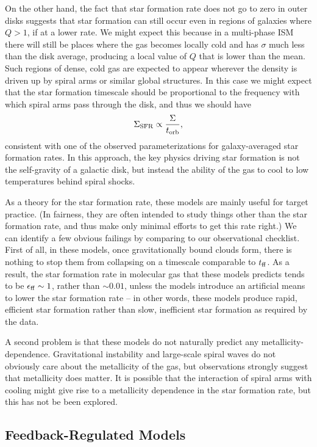 On the other hand, the fact that star formation rate does not go to zero in outer disks suggests that star formation can still occur even in regions of galaxies where $Q > 1$, if at a lower rate. We might expect this because in a multi-phase ISM there will still be places where the gas becomes locally cold and has $\sigma$ much less than the disk average, producing a local value of $Q$ that is lower than the mean. Such regions of dense, cold gas are expected to appear wherever the density is driven up by spiral arms or similar global structures. In this case we might expect that the star formation timescale should be proportional to the frequency with which spiral arms pass through the disk, and thus we should have
\begin{equation}
\Sigma_{\rm SFR} \propto \frac{\Sigma}{t_{\rm orb}},
\end{equation}
consistent with one of the observed parameterizations for galaxy-averaged star formation rates. In this approach, the key physics driving star formation is not the self-gravity of a galactic disk, but instead the ability of the gas to cool to low temperatures behind spiral shocks.

As a theory for the star formation rate, these models are mainly useful for target practice. (In fairness, they are often intended to study things other than the star formation rate, and thus make only minimal efforts to get this rate right.) We can identify a few obvious failings by comparing to our observational checklist. First of all, in these models, once gravitationally bound clouds form, there is nothing to stop them from collapsing on a timescale comparable to $t_{\rm ff}$. As a result, the star formation rate in molecular gas that these models predicts tends to be $\epsilon_{\rm ff} \sim 1$, rather than $\sim 0.01$, unless the models introduce an artificial means to lower the star formation rate -- in other words, these models produce rapid, efficient star formation rather than slow, inefficient star formation as required by the data.

A second problem is that these models do not naturally predict any metallicity-dependence. Gravitational instability and large-scale spiral waves do not obviously care about the metallicity of the gas, but observations strongly suggest that metallicity does matter. It is possible that the interaction of spiral arms with cooling might give rise to a metallicity dependence in the star formation rate, but this has not be been explored.


\subsection{Feedback-Regulated Models}

